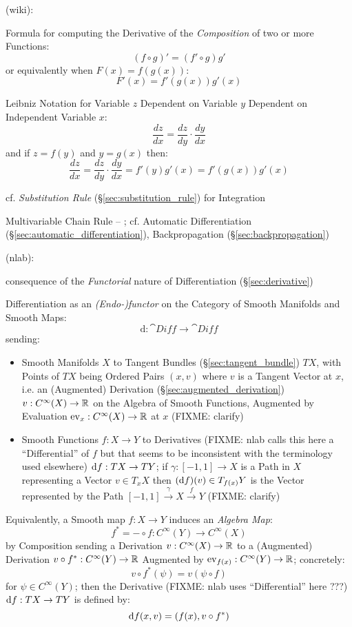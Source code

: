 (wiki):

Formula for computing the Derivative of the \emph{Composition} of two or more
Functions:
\[
  (f \circ g)' = (f' \circ g) g'
\]
or equivalently when $F(x) = f(g(x))$:
\[
  F'(x) = f'(g(x))g'(x)
\]

Leibniz Notation for Variable $z$ Dependent on Variable $y$ Dependent on
Independent Variable $x$:
\[
  \frac{dz}{dx} = \frac{dz}{dy} \cdot \frac{dy}{dx}
\]
and if $z = f(y)$ and $y = g(x)$ then:
\[
  \frac{dz}{dx} = \frac{dz}{dy} \cdot \frac{dy}{dx}
    = f'(y)g'(x) = f'(g(x))g'(x)
\]

\fist cf. \emph{Substitution Rule} (\S\ref{sec:substitution_rule}) for
Integration

Multivariable Chain Rule -- ; cf. Automatic Differentiation
(\S\ref{sec:automatic_differentiation}), Backpropagation
(\S\ref{sec:backpropagation})

(nlab):

consequence of the \emph{Functorial} nature of Differentiation
(\S\ref{sec:derivative})

Differentiation as an \emph{(Endo-)functor} on the Category of Smooth Manifolds
and Smooth Maps:
\[
  \mathrm{d} : \cat{Diff} \rightarrow \cat{Diff}
\]
sending:
\begin{itemize}
  \item Smooth Manifolds $X$ to Tangent Bundles (\S\ref{sec:tangent_bundle}) $T
    X$, with Points of $T X$ being Ordered Pairs $(x, v)$ where $v$ is a Tangent
    Vector at $x$, i.e. an (Augmented) Derivation
    (\S\ref{sec:augmented_derivation}) $v : C^\infty(X) \rightarrow \mathbb{R}$ on
    the Algebra of Smooth Functions, Augmented by Evaluation $\mathrm{ev}_x :
    C^\infty(X) \rightarrow \mathbb{R}$ at $x$ (FIXME: clarify)
  \item Smooth Functions $f : X \rightarrow Y$ to Derivatives (FIXME: nlab calls
    this here a ``Differential'' of $f$ but that seems to be inconsistent with
    the terminology used elsewhere) $\mathrm{d}f : TX \rightarrow TY$; if $\gamma
    : [-1,1] \rightarrow X$ is a Path in $X$ representing a Vector
    $v \in T_x{X}$ then $(\mathrm{d}f)(v) \in T_{f(x)}Y$ is the Vector represented
    by the Path $[-1, 1] \xrightarrow{\gamma} X \xrightarrow{f} Y$
    (FIXME: clarify)
\end{itemize}
Equivalently, a Smooth map $f : X \rightarrow Y$ induces an \emph{Algebra Map}:
\[
  f^* = - \circ f : C^\infty(Y) \rightarrow C^\infty(X)
\]
by Composition sending a Derivation $v : C^\infty(X) \rightarrow \mathbb{R}$ to a
(Augmented) Derivation $v \circ f^* : C^\infty(Y) \rightarrow \mathbb{R}$ Augmented
by $\mathrm{ev}_{f(x)} : C^\infty(Y) \rightarrow \mathbb{R}$; concretely:
\[
  v \circ f^*(\psi) = v(\psi \circ f)
\]
for $\psi \in C^\infty(Y)$; then the Derivative (FIXME: nlab uses
``Differential'' here ???) $\mathrm{d}f : T X \rightarrow T Y$ is defined by:
\[
  \mathrm{d}f(x,v) = (f(x), v \circ f^*)
\]



